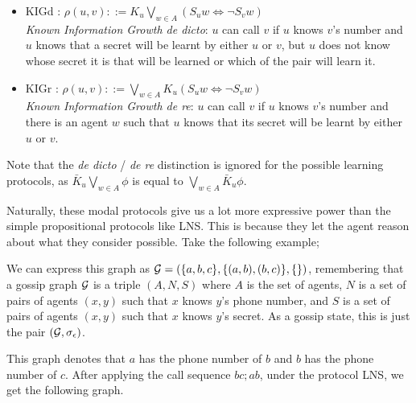 \documentclass[12pt, a4paper]{article} %
\begin{document}
\begin{itemize}
    \item \textsf{KIGd} : $\rho(u, v) ::= K_u \bigvee_{w \in A} \left(S_u w \iff \neg S_v w\right)$ \\ 
    \textit{Known Information Growth de dicto}: $u$ can call $v$ if $u$ knows $v$'s number and $u$ knows that a secret will be learnt by either $u$ or $v$, but $u$ does not know whose secret it is that will be learned or which of the pair will learn it. 
    \item \textsf{KIGr} : $\rho(u, v) ::= \bigvee_{w \in A} K_u \left(S_u w \iff \neg S_v w\right)$ \\ 
    \textit{Known Information Growth de re}: $u$ can call $v$ if $u$ knows $v$'s number and there is an agent $w$ such that $u$ knows that its secret will be learnt by either $u$ or $v$.
\end{itemize}

Note that the \textit{de dicto} / \textit{de re} distinction is ignored for the possible learning protocols, as $\bar K_u \bigvee_{w \in A} \phi$ is equal to $\bigvee_{w \in A} \bar K_u \phi$.

\hfill

Naturally, these modal protocols give us a lot more expressive power than the simple propositional protocols like \textsf{LNS}. This is because they let the agent reason about what they consider possible. Take the following example;

\begin{center}
\end{center}

We can express this graph as $\mathcal{G} = \left(\{a, b, c\}, \{(a, b), (b, c)\}, \{\}\right)$, remembering that a gossip graph $\mathcal{G}$ is a triple $(A, N, S)$ where $A$ is the set of agents, $N$ is a set of pairs of agents $(x, y)$ such that $x$ knows $y$'s phone number, and $S$ is a set of pairs of agents $(x, y)$ such that $x$ knows $y$'s secret. As a gossip state, this is just the pair $\left(\mathcal{G}, \sigma_\epsilon \right)$.

This graph denotes that $a$ has the phone number of $b$ and $b$ has the phone number of $c$. After applying the call sequence $bc; ab$, under the protocol \textsf{LNS}, we get the following graph.
\end{document}

